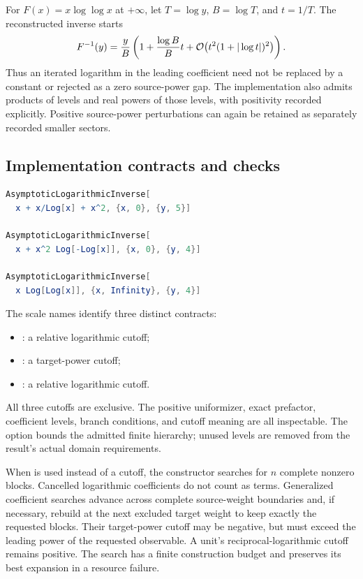 For $F(x)=x\log\log x$ at $+\infty$, let
$T=\log y$, $B=\log T$, and $t=1/T$. The reconstructed inverse starts
\begin{equation}
 F^{-1}(y)=\frac{y}{B}
 \left(1+\frac{\log B}{B}t
 +\mathcal O\!\left(t^2(1+|\log t|)^2\right)\right).
 \label{eq:leading-iterated-log-example}
\end{equation}
Thus an iterated logarithm in the leading coefficient need not be replaced
by a constant or rejected as a zero source-power gap. The implementation
also admits products of levels and real powers of those levels, with
positivity recorded explicitly. Positive source-power perturbations can
again be retained as separately recorded smaller sectors.

\subsection{Implementation contracts and checks}

\begin{lstlisting}[language=Mathematica]
AsymptoticLogarithmicInverse[
  x + x/Log[x] + x^2, {x, 0}, {y, 5}]

AsymptoticLogarithmicInverse[
  x + x^2 Log[-Log[x]], {x, 0}, {y, 4}]

AsymptoticLogarithmicInverse[
  x Log[Log[x]], {x, Infinity}, {y, 4}]
\end{lstlisting}

The scale names identify three distinct contracts:
\begin{itemize}[leftmargin=1.5em]
\item {}: a relative logarithmic cutoff;
\item {}: a target-power cutoff;
\item {}: a relative logarithmic cutoff.
\end{itemize}
All three cutoffs are exclusive. The positive uniformizer, exact prefactor, coefficient
levels, branch conditions, and cutoff meaning are all inspectable.
The option  bounds the admitted finite hierarchy;
unused levels are removed from the result's actual domain requirements.

When  is used instead of a cutoff, the constructor
searches for $n$ complete nonzero blocks. Cancelled logarithmic coefficients
do not count as terms. Generalized coefficient searches advance across
complete source-weight boundaries and, if necessary, rebuild at the next
excluded target weight to keep exactly the requested blocks. Their
target-power cutoff may be negative, but must exceed the leading power of
the requested observable. A unit's reciprocal-logarithmic cutoff remains
positive. The search has a finite construction budget and preserves its
best expansion in a resource failure.

